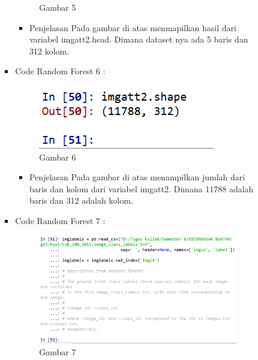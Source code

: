 \begin{enumerate}
\begin{itemize}
\begin{itemize}
\begin{itemize}
\begin{figure}[ht]
\caption{Gambar 5}
\label{contoh}
\end{figure}
\par
\begin{itemize}
\item Penjelasan  Pada gambar di atas menmapilkan hasil dari variabel imgatt2.head. Dimana dataset nya ada 5 baris dan 312 kolom.
\par
\par
\end{itemize}
\item Code Random Forest 6 :
\par
\begin{figure}[ht]
\centering
\includegraphics[scale=0.7]{figures/andi/RF6.PNG}
\caption{Gambar 6}
\label{contoh}
\end{figure}
\par
\begin{itemize}
\item Penjelasan  Pada gambar di atas menampilkan jumlah dari baris dan kolom dari variabel imgatt2. Dimana 11788 adalah baris dan 312 adalah kolom.
\par
\par
\end{itemize}
\item Code Random Forest 7 :
\par
\begin{figure}[ht]
\centering
\includegraphics[scale=0.7]{figures/andi/RF7.PNG}
\caption{Gambar 7}
\label{contoh}
\end{figure}

\end{itemize}
\end{itemize}
\end{itemize}
\end{enumerate}
